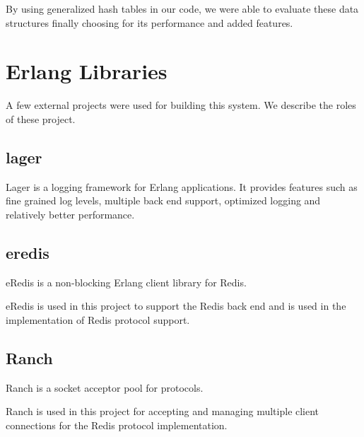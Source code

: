 By using generalized hash tables in our code, we were able to evaluate these
data structures finally choosing  for its performance and added
features.

\section{Erlang Libraries}

A few external projects were used for building this system. We describe the
roles of these project.

\subsection{lager}

Lager \citep{lager} is a logging framework for Erlang applications. It provides
features such as fine grained log levels, multiple back end support, optimized
logging and relatively better performance.

\subsection{eredis}

eRedis \citep{eredis} is a non-blocking Erlang client library for Redis.

eRedis is used in this project to support the Redis back end and is used in the
implementation of Redis protocol support.

\subsection{Ranch}

Ranch \citep{ranch} is a socket acceptor pool for  protocols.

Ranch is used in this project for accepting and managing multiple client
connections for the Redis protocol implementation.

